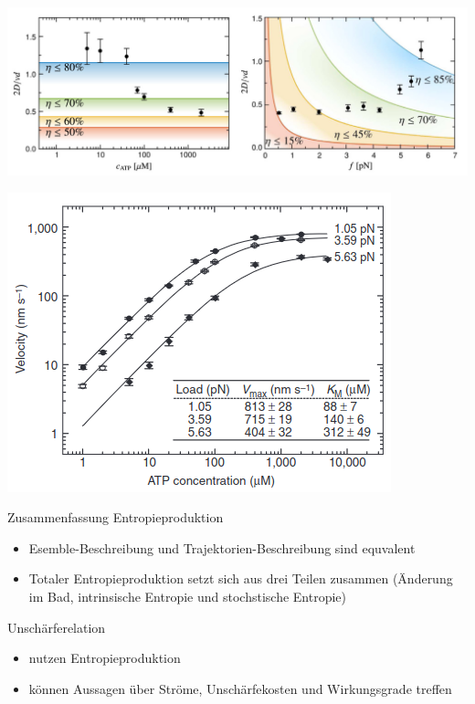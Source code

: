 \documentclass[aspectratio=1610, 9pt]{beamer}
\begin{document}
\begin{frame}
  
  \begin{minipage}{0.59\textwidth}
    \begin{center}
      \includegraphics[width=\textwidth]{images/kinesin_r.png}
    \end{center}
  \end{minipage}
\begin{minipage}{0.4\textwidth}
    \begin{center}
      \includegraphics[width=\textwidth]{images/kinesin_v.png}
    \end{center}
  \end{minipage}

\end{frame}

\begin{frame}{Zusammenfassung}
  Entropieproduktion
  \begin{itemize}
    \item Esemble-Beschreibung und Trajektorien-Beschreibung sind equvalent 
    \item Totaler Entropieproduktion setzt sich aus drei Teilen zusammen (Änderung im Bad, intrinsische Entropie und stochstische Entropie)
  \end{itemize}
Unschärferelation
\begin{itemize}
  \item nutzen Entropieproduktion 
  \item können Aussagen über Ströme, Unschärfekosten und Wirkungsgrade treffen
\end{itemize}
\end{frame}
\end{document}
